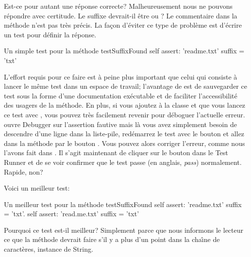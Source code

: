 \documentclass[a4paper,10pt,twoside]{book}
\begin{document}

Est-ce pour autant une r\'eponse correcte?  Malheureusement nous ne pouvons
r\'epondre avec certitude.
Le suffixe devrait-il \^etre  ou ?
Le commentaire dans la m\'ethode  n'est pas tr\`es pr\'ecis.
La fa\c{c}on d'\'eviter ce type de probl\`eme est d'\'ecrire
un test  pour d\'efinir la r\'eponse.

\begin{method}[testSuffix]{Un simple test pour la m\'ethode }
testSuffixFound
	self assert: 'readme.txt' suffix = 'txt'
\end{method}

L'effort requis pour ce faire est \`a peine plus important que celui
qui consiste \`a lancer le m\^eme test dans un espace de travail;
l'avantage de \sunit est de sauvegarder ce test sous la forme d'une
documentation ex\'ecutable et de faciliter l'accessibilit\'e des usagers
de la m\'ethode.
En plus, si vous ajoutez  \`a la classe
 et que vous lancez ce test avec \sunit, vous
pouvez tr\`es facilement revenir pour d\'eboguer l'actuelle erreur.
\sunit ouvre Debugger sur l'assertion fautive mais l\`a vous
avez simplement besoin de descendre d'une ligne dans la liste-pile,
red\'emarrez le test avec le bouton  et allez
dans la m\'ethode  par le bouton . Vous
pouvez alors corriger l'erreur, comme nous l'avons fait dans
.
Il s'agit maintenant de cliquer sur le bouton  dans
le \sunit Test Runner et de se voir confirmer que le test passe (en anglais, \emph{pass}) normalement. Rapide, non?

Voici un meilleur test:

\begin{method}[testSuffix2]{Un meilleur test pour la m\'ethode }
testSuffixFound
	self assert: 'readme.txt' suffix = 'txt'.
	self assert: 'read.me.txt' suffix = 'txt'
\end{method}
\noindent
Pourquoi ce test est-il meilleur? Simplement parce que
nous informons le lecteur ce que la m\'ethode devrait faire 
s'il y a plus d'un point dans la cha\^{\i}ne de caract\`eres, instance de String.
\end{document}

